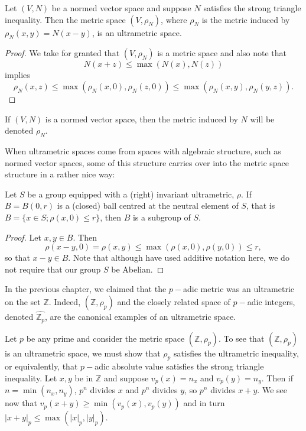 \begin{proposition}
	Let $(V,N)$ be a normed vector space and suppose $N$ satisfies the strong triangle inequality. Then the metric space $(V,\rho_N)$, where $\rho_N$ is the metric induced by $\rho_N(x,y) = N(x-y)$, is an ultrametric space.
\end{proposition}

\begin{proof}
We take for granted that  $(V,\rho_N)$ is a metric space and also note that 
\[N(x + z) \leq \max(N(x), N(z))\]
 implies  
\[\rho_N(x,z) \leq \max(\rho_N(x,0), \rho_N(z,0)) \leq \max(\rho_N(x,y), \rho_N(y,z)).\]
\end{proof}

\begin{notation*}
 If $(V, N)$ is a normed vector space, then the metric induced by $N$ will be denoted $\rho_N$.
\end{notation*}

When ultrametric spaces come from spaces with algebraic structure, such as normed vector spaces, some of this structure carries over into the metric space structure in a rather nice way:\\

\begin{proposition}
\cite{ar} Let $S$ be a  group equipped with a (right) invariant ultrametric, $\rho$. If $B=B(0,r)$ is a (closed) ball centred at the neutral element of $S$, that is $B=\{x \in S; \rho(x,0) \leq r\}$, then $B$ is a subgroup of $S$.
\end{proposition}

\begin{proof}
Let $x,y \in B$. Then \[\rho(x-y,0) = \rho(x,y)  \leq \max(\rho(x,0), \rho(y,0)) \leq r,\]
so that $x-y \in B$. Note that although have used additive notation here, we do not require that our group $S$ be Abelian.
\end{proof}
 
In the previous chapter, we claimed that the $p-$adic metric was an ultrametric on the set $\mathbb{Z}$. Indeed, $(\mathbb{Z}, \rho_p)$ and the closely related space of $p-$adic integers, denoted $\widehat{\mathbb{Z}_p}$, are the canonical examples of an ultrametric space. \\

\begin{example} 
Let $p$ be any prime and consider the metric space $(\mathbb{Z}, \rho_p)$. To see that $(\mathbb{Z}, \rho_p)$ is an ultrametric space, we must show that $\rho_p$ satisfies the ultrametric inequality, or equivalently, that $p-$adic absolute value satisfies the strong triangle inequality. Let $x,y$ be in $\mathbb{Z}$ and suppose $v_p(x)= n_x$ and $v_p(y)= n_y$. Then if $n=\min(n_x,n_y)$, $p^n $ divides $x$ and $p^n$ divides $y$, so $p^n$ divides $x +y$. We see now that $v_p(x+y) \geq \min(v_p(x),  v_p(y))$ and in turn $\lvert x + y \rvert_p \leq \max(\lvert x \rvert_p, \lvert y \rvert_p)$.
\end{example}


